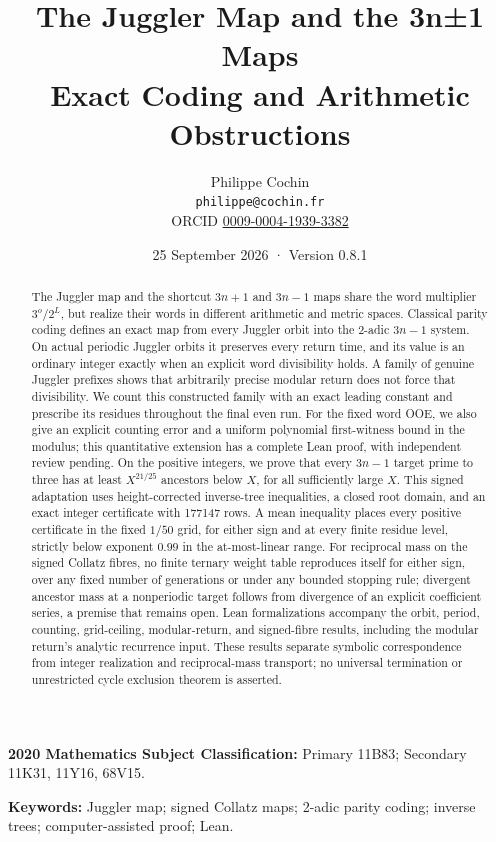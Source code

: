 \documentclass[11pt,a4paper]{article}
\title{The Juggler Map and the 3n±1 Maps\\[0.5em]{\large Exact Coding
and Arithmetic Obstructions}}
\author{Philippe Cochin \\ \texttt{philippe@cochin.fr} \\
  \small ORCID \href{https://orcid.org/0009-0004-1939-3382}{0009-0004-1939-3382}}
\date{25 September 2026 · Version 0.8.1}
\begin{document}
\maketitle
\begin{abstract}

The Juggler map and the shortcut \(3n+1\) and \(3n-1\) maps share the
word multiplier \(3^o/2^L\), but realize their words in different
arithmetic and metric spaces. Classical parity coding defines an exact
map from every Juggler orbit into the 2-adic \(3n-1\) system. On actual
periodic Juggler orbits it preserves every return time, and its value is
an ordinary integer exactly when an explicit word divisibility holds. A
family of genuine Juggler prefixes shows that arbitrarily precise
modular return does not force that divisibility. We count this
constructed family with an exact leading constant and prescribe its
residues throughout the final even run. For the fixed word OOE, we also
give an explicit counting error and a uniform polynomial first-witness
bound in the modulus; this quantitative extension has a complete Lean
proof, with independent review pending. On the positive integers, we
prove that every \(3n-1\) target prime to three has at least
\(X^{21/25}\) ancestors below \(X\), for all sufficiently large \(X\).
This signed adaptation uses height-corrected inverse-tree inequalities,
a closed root domain, and an exact integer certificate with 177147 rows.
A mean inequality places every positive certificate in the fixed
\(1/50\) grid, for either sign and at every finite residue level,
strictly below exponent \(0.99\) in the at-most-linear range. For
reciprocal mass on the signed Collatz fibres, no finite ternary weight
table reproduces itself for either sign, over any fixed number of
generations or under any bounded stopping rule; divergent ancestor mass
at a nonperiodic target follows from divergence of an explicit
coefficient series, a premise that remains open. Lean formalizations
accompany the orbit, period, counting, grid-ceiling, modular-return, and
signed-fibre results, including the modular return's analytic recurrence
input. These results separate symbolic correspondence from integer
realization and reciprocal-mass transport; no universal termination or
unrestricted cycle exclusion theorem is asserted.

\end{abstract}

\textbf{2020 Mathematics Subject Classification:} Primary 11B83;
Secondary 11K31, 11Y16, 68V15.

\textbf{Keywords:} Juggler map; signed Collatz maps; 2-adic parity
coding; inverse trees; computer-assisted proof; Lean.
\end{document}
